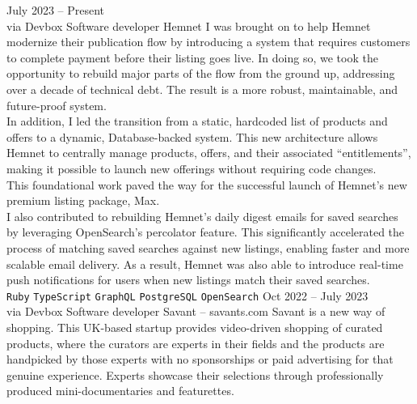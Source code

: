 \documentclass[9pt]{template} %
\begin{document}
\begin{entrylist}
  \entry
    {July 2023 -- Present\\\footnotesize{via Devbox}}
    {Software developer}
    {Hemnet}
    {
      I was brought on to help Hemnet modernize their publication flow by introducing
      a system that requires customers to complete payment before their listing goes
      live. In doing so, we took the opportunity to rebuild major parts of the flow
      from the ground up, addressing over a decade of technical debt. The result is a
      more robust, maintainable, and future-proof system.\\

      In addition, I led the transition from a static, hardcoded list of products and
      offers to a dynamic, Database-backed system. This new architecture allows Hemnet
      to centrally manage products, offers, and their associated “entitlements”, making
      it possible to launch new offerings without requiring code changes.\\

      This foundational work paved the way for the successful launch of Hemnet's new
      premium listing package, Max.\\

      I also contributed to rebuilding Hemnet's daily digest emails for saved searches
      by leveraging OpenSearch's percolator feature. This significantly accelerated the
      process of matching saved searches against new listings, enabling faster and more
      scalable email delivery. As a result, Hemnet was also able to introduce real-time
      push notifications for users when new listings match their saved searches.\\
      \texttt{Ruby}\slashsep
      \texttt{TypeScript}\slashsep
      \texttt{GraphQL}\slashsep
      \texttt{PostgreSQL}\slashsep
      \texttt{OpenSearch}
    }
  \entry
    {Oct 2022 -- July 2023\\\footnotesize{via Devbox}}
    {Software developer}
    {Savant -- savants.com}
    {
      Savant is a new way of shopping. This UK-based startup provides
      video-driven shopping of curated products, where the curators are experts
      in their fields and the products are handpicked by those experts with no
      sponsorships or paid advertising for that genuine experience. Experts
      showcase their selections through professionally produced
      mini-documentaries and featurettes.\\

}
\end{entrylist}
\end{document}
